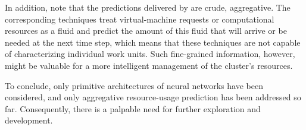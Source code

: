 In addition, note that the predictions delivered by \cite{dabbagh2015,
ismaeel2015, cao2014} are crude, aggregative. The corresponding techniques treat
virtual-machine requests or computational resources as a fluid and predict the
amount of this fluid that will arrive or be needed at the next time step, which
means that these techniques are not capable of characterizing individual work
units. Such fine-grained information, however, might be valuable for a more
intelligent management of the cluster's resources.

To conclude, only primitive architectures of neural networks have been
considered, and only aggregative resource-usage prediction has been addressed so
far. Consequently, there is a palpable need for further exploration and
development.
